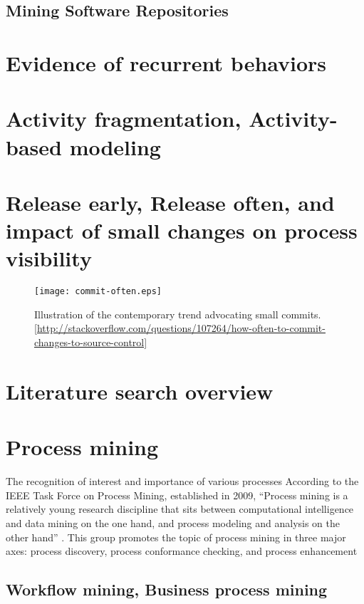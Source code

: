 \subsection{Mining Software Repositories}\label{background.msr.summary}


\section{Evidence of recurrent behaviors}

\section{Activity fragmentation, Activity-based modeling}\label{activity}

\section{Release early, Release often, and impact of small changes on process visibility}
\begin{figure}[tbp]
   \centering
   \texttt{[image: commit-often.eps]}
   \caption{Illustration of the contemporary trend advocating small commits. 
\ref{http://stackoverflow.com/questions/107264/how-often-to-commit-changes-to-source-control}}
   \label{fig:commit-often}
\end{figure}


\section{Literature search overview}

\section{Process mining}
The recognition of interest and importance of various processes 
According to the IEEE Task Force on Process Mining, established in 2009, ``Process mining is 
a relatively young research discipline that sits between computational intelligence and data 
mining on the one hand, and process modeling and analysis on the other hand'' \cite{citeulike:11077707}.
This group promotes the topic of process mining in three major axes: process discovery,
process conformance checking, and process enhancement 

\subsection{Workflow mining, Business process mining}\label{mackground.bpm}


